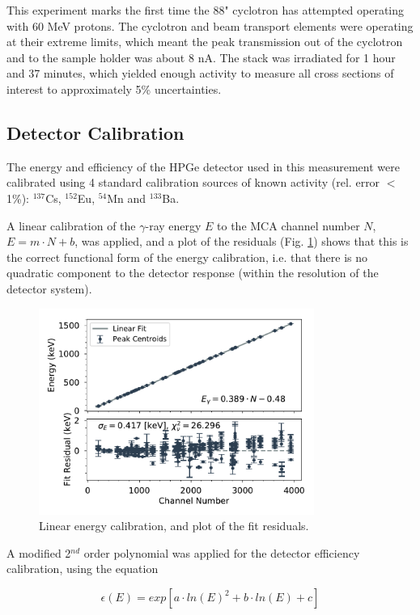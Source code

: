 \documentclass[aps,superscriptaddress,twocolumn,secnumarabic,balancelastpage,amsmath,amssymb,nofootinbib,floatfix]{revtex4-1}
\begin{document}
This experiment marks the first time the 88" cyclotron has attempted operating with 60 MeV protons.  The cyclotron and beam transport elements were operating at their extreme limits, which meant the peak transmission out of the cyclotron and to the sample holder was about 8 nA.  The stack was irradiated for 1 hour and 37 minutes, which yielded enough activity to measure all cross sections of interest to approximately 5\% uncertainties.


\subsection{Detector Calibration}

The energy and efficiency of the HPGe detector used in this measurement were calibrated using 4 standard calibration sources of known activity (rel. error $<$1\%): $^{137}$Cs, $^{152}$Eu, $^{54}$Mn and $^{133}$Ba.

A linear calibration of the $\gamma$-ray energy $E$ to the MCA channel number $N$, $E = m\cdot N+b$, was applied, and a plot of the residuals (Fig. \ref{fig:energy_calibration}) shows that this is the correct functional form of the energy calibration, i.e. that there is no quadratic component to the detector response (within the resolution of the detector system).

\begin{figure}[htb]
\includegraphics[width=9cm]{calibration/energy_calibration.pdf}
\caption{Linear energy calibration, and plot of the fit residuals.
}
\label{fig:energy_calibration}
\end{figure}

A modified 2$^{nd}$ order polynomial was applied for the detector efficiency calibration, using the equation

\begin{equation}
\epsilon (E) = exp[a\cdot ln(E)^2+b\cdot ln(E)+c]
\end{equation}
\end{document}
